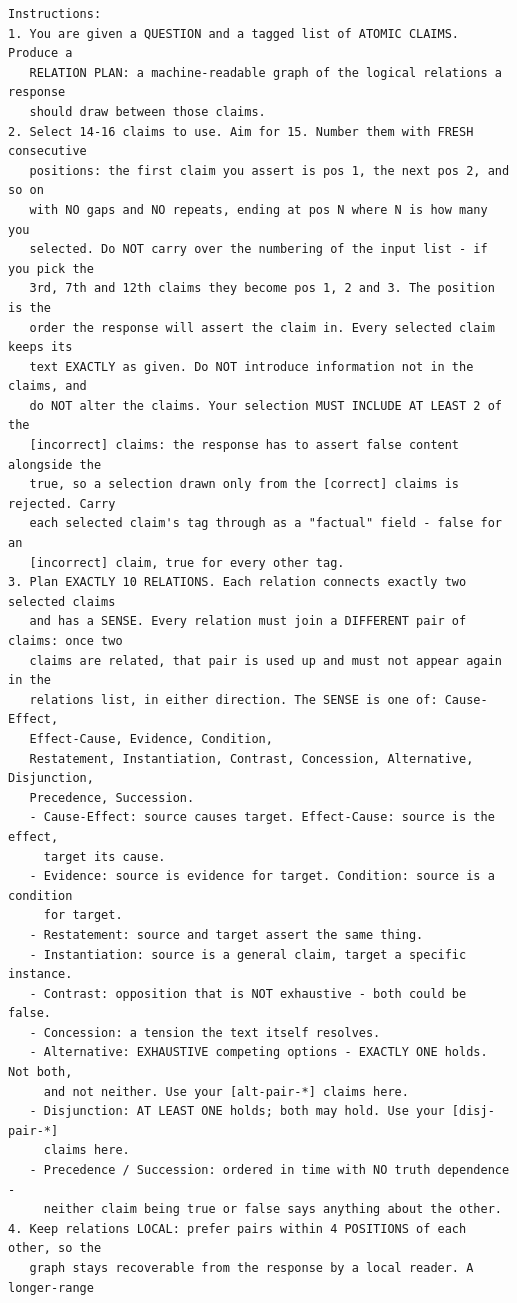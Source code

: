 \documentclass[11pt]{article}
\begin{document}
\begin{small}
\begin{verbatim}
Instructions:
1. You are given a QUESTION and a tagged list of ATOMIC CLAIMS. Produce a
   RELATION PLAN: a machine-readable graph of the logical relations a response
   should draw between those claims.
2. Select 14-16 claims to use. Aim for 15. Number them with FRESH consecutive
   positions: the first claim you assert is pos 1, the next pos 2, and so on
   with NO gaps and NO repeats, ending at pos N where N is how many you
   selected. Do NOT carry over the numbering of the input list - if you pick the
   3rd, 7th and 12th claims they become pos 1, 2 and 3. The position is the
   order the response will assert the claim in. Every selected claim keeps its
   text EXACTLY as given. Do NOT introduce information not in the claims, and
   do NOT alter the claims. Your selection MUST INCLUDE AT LEAST 2 of the
   [incorrect] claims: the response has to assert false content alongside the
   true, so a selection drawn only from the [correct] claims is rejected. Carry
   each selected claim's tag through as a "factual" field - false for an
   [incorrect] claim, true for every other tag.
3. Plan EXACTLY 10 RELATIONS. Each relation connects exactly two selected claims
   and has a SENSE. Every relation must join a DIFFERENT pair of claims: once two
   claims are related, that pair is used up and must not appear again in the
   relations list, in either direction. The SENSE is one of: Cause-Effect,
   Effect-Cause, Evidence, Condition,
   Restatement, Instantiation, Contrast, Concession, Alternative, Disjunction,
   Precedence, Succession.
   - Cause-Effect: source causes target. Effect-Cause: source is the effect,
     target its cause.
   - Evidence: source is evidence for target. Condition: source is a condition
     for target.
   - Restatement: source and target assert the same thing.
   - Instantiation: source is a general claim, target a specific instance.
   - Contrast: opposition that is NOT exhaustive - both could be false.
   - Concession: a tension the text itself resolves.
   - Alternative: EXHAUSTIVE competing options - EXACTLY ONE holds. Not both,
     and not neither. Use your [alt-pair-*] claims here.
   - Disjunction: AT LEAST ONE holds; both may hold. Use your [disj-pair-*]
     claims here.
   - Precedence / Succession: ordered in time with NO truth dependence -
     neither claim being true or false says anything about the other.
4. Keep relations LOCAL: prefer pairs within 4 POSITIONS of each other, so the
   graph stays recoverable from the response by a local reader. A longer-range

\end{verbatim}
\end{small}
\end{document}
